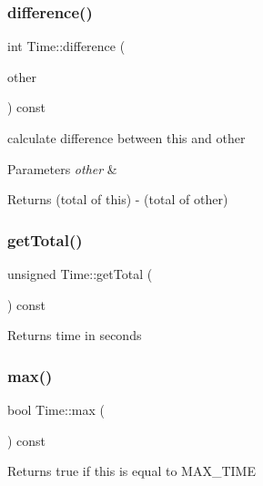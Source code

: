 \subsubsection{\texorpdfstring{difference()}{difference()}}
{\footnotesize\ttfamily int Time\+::difference (\begin{DoxyParamCaption}\item[{\hyperlink{classTime}{Time} const \&}]{other }\end{DoxyParamCaption}) const}

calculate difference between this and other 
\begin{DoxyParams}{Parameters}
{\em other} & \\
\hline
\end{DoxyParams}
\begin{DoxyReturn}{Returns}
(total of this) -\/ (total of other) 
\end{DoxyReturn}
\mbox{\label{classTime_ac64625b85a2497986774edcc8dde50e9}} 
\subsubsection{\texorpdfstring{get\+Total()}{getTotal()}}
{\footnotesize\ttfamily unsigned Time\+::get\+Total (\begin{DoxyParamCaption}{ }\end{DoxyParamCaption}) const}

\begin{DoxyReturn}{Returns}
time in seconds 
\end{DoxyReturn}
\mbox{\label{classTime_a57f85c6b8295acdcf4e2f22ce7685170}} 
\subsubsection{\texorpdfstring{max()}{max()}}
{\footnotesize\ttfamily bool Time\+::max (\begin{DoxyParamCaption}{ }\end{DoxyParamCaption}) const}

\begin{DoxyReturn}{Returns}
true if this is equal to M\+A\+X\+\_\+\+T\+I\+ME 
\end{DoxyReturn}
\mbox{\label{classTime_a7bc1d44c446e70740ab3f0dd64e457be}} 
